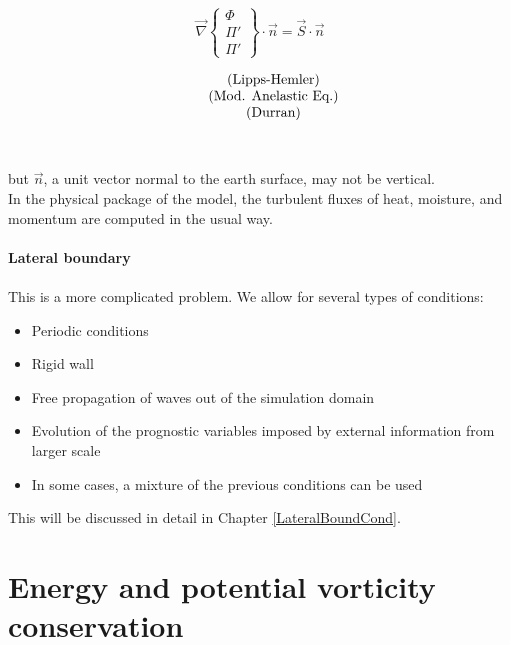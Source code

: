 %
\parbox{2cm}{
\quad
}
\hfill
\parbox{5cm}{
\begin{displaymath}
\vec{\nabla} \left\{
\begin{array}{c}
\Phi \\
\Pi '  \\
\Pi '
\end{array}
\right\} \cdot \vec{n} = \vec{S}\cdot \vec{n}
\end{displaymath}
}
\hfill
\parbox{5cm}{
\begin{displaymath}
\begin{array}{c@{\quad}c}
\quad &\mbox{(Lipps-Hemler)} \\
\quad &\mbox{(Mod. Anelastic Eq.)} \\
\quad &\mbox{(Durran)}
\end{array}
\end{displaymath}
}
\hfill
\parbox{1cm}{
\begin{eqnarray}
 \\   \\
\end{eqnarray}
}
%

but $\vec{n}$, a unit vector normal to the earth surface, may not be vertical.\\

In the physical package of the model, the turbulent fluxes of heat, moisture,
and momentum are computed in the usual way.
\\
\\
{\bf Lateral boundary}
\\
\\
This is a more complicated problem. We allow for several types of conditions:

\begin{itemize}
\item Periodic conditions
\item Rigid wall
\item Free propagation of waves out of the simulation domain
\item Evolution  of the prognostic variables imposed by external information
from larger scale
\item In some cases, a mixture of the previous conditions can be used
\end{itemize}

This will be discussed in detail in Chapter \ref{LateralBoundCond}.

\section{Energy and potential vorticity conservation}

